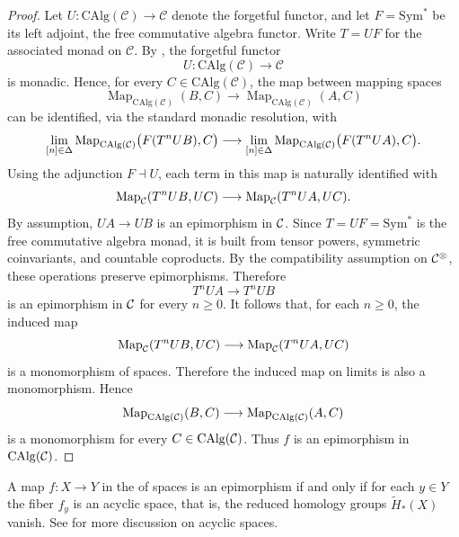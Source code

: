 \documentclass[10pt,a4paper,oneside]{article}
\begin{document}
\begin{proof}
Let $U:\mathrm{CAlg}(\mathcal C)\to \mathcal C$ denote the forgetful functor, and let $F=\mathrm{Sym}^*$ be its left adjoint, the free commutative algebra functor. Write $T=UF$ for the associated monad on $\mathcal C$. By \cite[Barr-Beck-Lurie Theorem 4.7.3.5]{ha}, the forgetful functor
\[
U:\mathrm{CAlg}(\mathcal C)\to \mathcal C
\]
is monadic. Hence, for every $C\in \mathrm{CAlg}(\mathcal C)$, the map between mapping spaces
\[
\operatorname{Map}_{\mathrm{CAlg}(\mathcal C)}(B,C)
\longrightarrow
\operatorname{Map}_{\mathrm{CAlg}(\mathcal C)}(A,C)
\]
can be identified, via the standard monadic resolution, with
\[
\lim_{[n]\in \Delta}
\operatorname{Map}_{\operatorname{CAlg}(\mathcal{C})}
\bigl(F(T^nUB),C\bigr)
\longrightarrow
\lim_{[n]\in \Delta}
\operatorname{Map}_{\operatorname{CAlg}(\mathcal{C})}
\bigl(F(T^nUA),C\bigr).
\]
Using the adjunction \(F\dashv U\), each term in this map is naturally identified with
\[
\operatorname{Map}_{\mathcal{C}}(T^nUB,UC)
\longrightarrow
\operatorname{Map}_{\mathcal{C}}(T^nUA,UC).
\]
By assumption, $UA\to UB$ is an epimorphism in $\mathcal{C}$. Since $T=UF=\mathrm{Sym}^*$ is the free commutative algebra monad, it is built from tensor powers, symmetric coinvariants, and countable coproducts. By the compatibility assumption on $\mathcal{C}^\otimes$, these operations preserve epimorphisms. Therefore
\[
T^nUA\longrightarrow T^nUB
\]
is an epimorphism in $\mathcal{C}$ for every $n\geq 0$. It follows that, for each $n\geq 0$, the induced map
\[
\operatorname{Map}_{\mathcal{C}}(T^nUB,UC)
\longrightarrow
\operatorname{Map}_{\mathcal{C}}(T^nUA,UC)
\]
is a monomorphism of spaces. Therefore the induced map on limits is also a monomorphism. Hence
\[
\operatorname{Map}_{\operatorname{CAlg}(\mathcal{C})}(B,C)
\longrightarrow
\operatorname{Map}_{\operatorname{CAlg}(\mathcal{C})}(A,C)
\]
is a monomorphism for every $C\in \operatorname{CAlg}(\mathcal{C})$. Thus $f$ is an epimorphism in $\operatorname{CAlg}(\mathcal{C})$.
\end{proof}

\begin{ex}\label{acyc}
A map $f \colon X\to Y$ in the \infcat of spaces is an epimorphism if and only if for each $y\in Y$ the fiber $f_y$ is an acyclic space, that is, the reduced homology groups $\widetilde{H}_*(X)$ vanish. See \cite{hoyois2019quillen,Raptis2019} for more discussion on acyclic spaces.
\end{ex}
\end{document}
